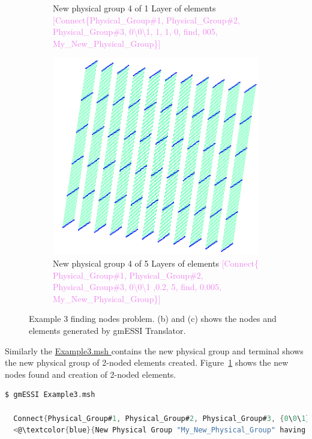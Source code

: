\documentclass[11pt]{article}
\begin{document}
\begin{figure}[h]
\begin{subfigure}[b]{0.3\textwidth}
    \caption{New physical group 4 of 1 Layer of elements \textcolor{violet}{[Connect\{Physical\_Group\#1, Physical\_Group\#2, Physical\_Group\#3, 0\textbackslash0\textbackslash1, 1, 1, 0, find, 005, My_New_Physical_Group\}]}}
  \end{subfigure}\hfill
    \begin{subfigure}[b]{0.3\textwidth}
    \includegraphics[width=\textwidth]{Images/Example3-5layers.png}
    \caption{New physical group 4 of 5 Layers of elements \textcolor{violet}{[Connect\{ Physical\_Group\#1, Physical\_Group\#2, Physical\_Group\#3, 0\textbackslash0\textbackslash1 ,0.2, 5, find, 0.005, My_New_Physical_Group\}]}}
  \end{subfigure}
  \caption{\label{Example-3-Connect-Command}Example 3 finding nodes problem. (b)
  and (c) shows the nodes and elements generated by gmESSI Translator. }
\end{figure}

Similarly the \href{http://beta.sumeetsinha.in/gmESSI/Examples/Example3/Exampl
e3_ESSI_Simulation/Example3.msh}{ Example3.msh } contains the new physical
group and terminal shows the new physical group of 2-noded elements created.
Figure~\ref{Example-3-Connect-Command} shows the new nodes found and creation of
2-noded elements.

\begin{lstlisting}[language=C]
$ gmESSI Example3.msh

  Connect{Physical_Group#1, Physical_Group#2, Physical_Group#3, {0\0\1}, 1, 1, find, 0.005, My_New_Physical_Group}  Found!!
  <@\textcolor{blue}{New Physical Group "My_New_Physical_Group" having id 4 consisting of 242 Nodes and 121 2-noded elements created }@>

\end{lstlisting}
\end{document}
